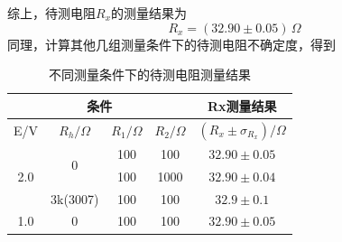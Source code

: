 \documentclass[12pt]{article}
\begin{document}
综上，待测电阻$R_x$的测量结果为
\begin{equation}
    R_x = (32.90\pm0.05)\,\Omega
\end{equation}
同理，计算其他几组测量条件下的待测电阻不确定度，得到
\begin{table}[H]
    \centering
    \begin{tabular}{|cccc|c|}
        \hline
        \multicolumn{4}{|c|}{条件}                                                                                                                & Rx测量结果                      \\ \hline
        \multicolumn{1}{|c|}{E/V}                  & \multicolumn{1}{c|}{$R_h/\Omega$}       & \multicolumn{1}{c|}{$R_1/\Omega$} & $R_2/\Omega$  & $(R_x\pm\sigma_{R_x})/\Omega$ \\ \hline
        \multicolumn{1}{|c|}{\multirow{3}{*}{2.0}} & \multicolumn{1}{c|}{\multirow{2}{*}{0}} & \multicolumn{1}{c|}{100}          & 100          & $32.90\pm0.05$              \\ \cline{3-5} 
        \multicolumn{1}{|c|}{}                     & \multicolumn{1}{c|}{}                   & \multicolumn{1}{c|}{100}          & 1000         & $32.90\pm0.04$                       \\ \cline{2-5} 
        \multicolumn{1}{|c|}{}                     & \multicolumn{1}{c|}{3k(3007)}           & \multicolumn{1}{c|}{100}          & 100          & $32.9\pm0.1$                       \\ \hline
        \multicolumn{1}{|c|}{1.0}                  & \multicolumn{1}{c|}{0}                  & \multicolumn{1}{c|}{100}          & 100          & $32.90\pm0.05$                      \\ \hline
        \end{tabular}
    \caption{不同测量条件下的待测电阻测量结果}
    \end{table}
\end{document}
